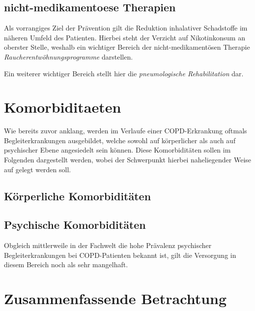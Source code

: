 \subsection{nicht-medikamentoese Therapien}
\label{nicht-medikamentoese therapien}
Als vorrangiges Ziel der Prävention gilt die Reduktion inhalativer Schadstoffe im näheren Umfeld des Patienten. Hierbei steht der Verzicht auf Nikotinkonsum an oberster Stelle, weshalb ein wichtiger Bereich der nicht-medikamentösen Therapie \emph{Raucherentwöhnungsprogramme} darstellen.

Ein weiterer wichtiger Bereich stellt hier die \emph{pneumologische Rehabilitation} dar. 

\section{Komorbiditaeten}
\label{komorbiditaeten}
Wie bereits zuvor anklang, werden im Verlaufe einer COPD-Erkrankung oftmals Begleiterkrankungen ausgebildet, welche sowohl auf körperlicher als auch auf psychischer Ebene angesiedelt sein können. Diese Komorbiditäten sollen im Folgenden dargestellt werden, wobei der Schwerpunkt hierbei naheliegender Weise auf \label{psychische_komorbiditaet} gelegt werden soll.

\subsection{Körperliche Komorbiditäten}


\subsection{Psychische Komorbiditäten}
\label{psychische_komorbiditaet}
Obgleich mittlerweile in der Fachwelt die hohe Prävalenz psychischer Begleiterkrankungen bei COPD-Patienten bekannt ist, gilt die Versorgung in diesem Bereich noch als sehr mangelhaft. 

\section{Zusammenfassende Betrachtung}
\label{zusammenfassende betrachtung}

\newpage\thispagestyle{empty}